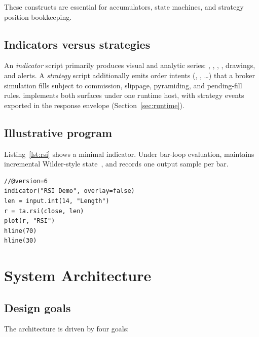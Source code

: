 \documentclass[11pt,a4paper]{article}
\begin{document}
These constructs are essential for accumulators, state machines, and strategy
position bookkeeping.

\subsection{Indicators versus strategies}
\label{sec:ind-vs-strat}

An \emph{indicator} script primarily produces visual and analytic series:
, , , , drawings, and
alerts.
A \emph{strategy} script additionally emits order intents
(, , \ldots) that a broker
simulation fills subject to commission, slippage, pyramiding, and pending-fill
rules.
\pyne{} implements both surfaces under one runtime host, with strategy events
exported in the response envelope (Section~\ref{sec:runtime}).

\subsection{Illustrative program}
\label{sec:example}

Listing~\ref{lst:rsi} shows a minimal indicator.
Under bar-loop evaluation,  maintains incremental Wilder-style
state~\citep{wilder1978new}, and  records one output sample per bar.

\begin{lstlisting}[style=pine,caption={Minimal RSI indicator (Pine).},label={lst:rsi}]
//@version=6
indicator("RSI Demo", overlay=false)
len = input.int(14, "Length")
r = ta.rsi(close, len)
plot(r, "RSI")
hline(70)
hline(30)
\end{lstlisting}

\section{System Architecture}
\label{sec:architecture}

\subsection{Design goals}
\label{sec:goals}

The architecture is driven by four goals:
\end{document}
